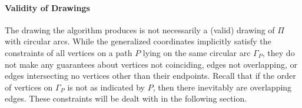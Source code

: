 \paragraph{Validity of Drawings}

The drawing the algorithm produces is not necessarily a (valid) drawing of ${\Pi}$ with circular arcs. While the generalized coordinates implicitly satisfy the constraints of all vertices on a path ${P}$ lying on the same circular arc ${\Gamma_P}$, they do not make any guarantees about vertices not coinciding, edges not overlapping, or edges intersecting no vertices other than their endpoints. Recall that if the order of vertices on ${\Gamma_P}$ is not as indicated by ${P}$, then there inevitably are overlapping edges. These constraints will be dealt with in the following section.
